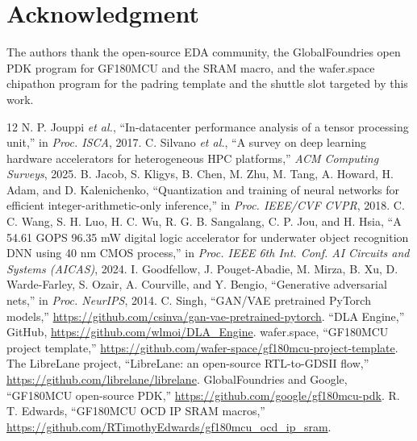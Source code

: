 \documentclass[conference,a4paper]{APSIPA2026}
\begin{document}
\section*{Acknowledgment}
The authors thank the open-source EDA community, the GlobalFoundries open PDK program for GF180MCU and the SRAM macro, and the wafer.space chipathon program for the padring template and the shuttle slot targeted by this work.

\begin{thebibliography}{12}
 N. P. Jouppi \emph{et al.}, ``In-datacenter performance analysis of a tensor processing unit,'' in \emph{Proc. ISCA}, 2017.
 C. Silvano \emph{et al.}, ``A survey on deep learning hardware accelerators for heterogeneous HPC platforms,'' \emph{ACM Computing Surveys}, 2025.
 B. Jacob, S. Kligys, B. Chen, M. Zhu, M. Tang, A. Howard, H. Adam, and D. Kalenichenko, ``Quantization and training of neural networks for efficient integer-arithmetic-only inference,'' in \emph{Proc. IEEE/CVF CVPR}, 2018.
 C. C. Wang, S. H. Luo, H. C. Wu, R. G. B. Sangalang, C. P. Jou, and H. Hsia, ``A 54.61 GOPS 96.35 mW digital logic accelerator for underwater object recognition DNN using 40 nm CMOS process,'' in \emph{Proc. IEEE 6th Int. Conf. AI Circuits and Systems (AICAS)}, 2024.
 I. Goodfellow, J. Pouget-Abadie, M. Mirza, B. Xu, D. Warde-Farley, S. Ozair, A. Courville, and Y. Bengio, ``Generative adversarial nets,'' in \emph{Proc. NeurIPS}, 2014.
 C. Singh, ``GAN/VAE pretrained PyTorch models,'' \url{https://github.com/csinva/gan-vae-pretrained-pytorch}.
 ``DLA Engine,'' GitHub, \url{https://github.com/wlmoi/DLA_Engine}.
 wafer.space, ``GF180MCU project template,'' \url{https://github.com/wafer-space/gf180mcu-project-template}.
 The LibreLane project, ``LibreLane: an open-source RTL-to-GDSII flow,'' \url{https://github.com/librelane/librelane}.
 GlobalFoundries and Google, ``GF180MCU open-source PDK,'' \url{https://github.com/google/gf180mcu-pdk}.
 R. T. Edwards, ``GF180MCU OCD IP SRAM macros,'' \url{https://github.com/RTimothyEdwards/gf180mcu_ocd_ip_sram}.
\end{thebibliography}
\end{document}
